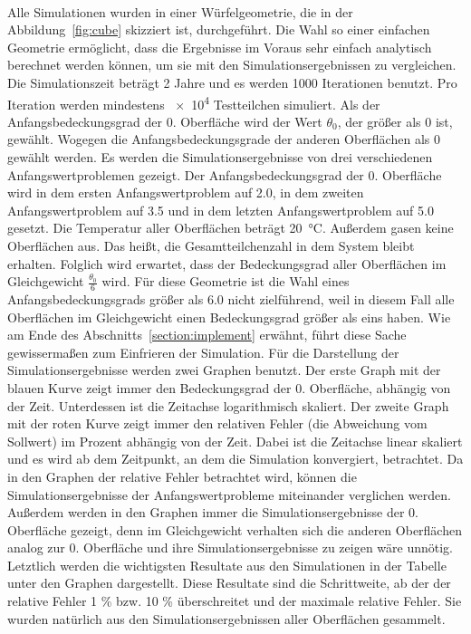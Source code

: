 \documentclass{listhesis}
\begin{document}
\paragraph{}
Alle Simulationen wurden in einer Würfelgeometrie, die in der Abbildung~\ref{fig:cube} skizziert ist, durchgeführt. Die Wahl so einer einfachen Geometrie ermöglicht, dass die Ergebnisse im Voraus sehr einfach analytisch berechnet werden können, um sie mit den Simulationsergebnissen zu vergleichen. Die Simulationszeit beträgt 2 Jahre und es werden 1000 Iterationen benutzt. Pro Iteration werden mindestens \SI{e4}{} Testteilchen simuliert. Als der Anfangsbedeckungsgrad der 0. Oberfläche wird der Wert $\theta_0$, der größer als 0 ist, gewählt. Wogegen die Anfangsbedeckungsgrade der anderen Oberflächen als 0 gewählt werden. Es werden die Simulationsergebnisse von drei verschiedenen Anfangswertproblemen gezeigt. Der Anfangsbedeckungsgrad der 0. Oberfläche wird in dem ersten Anfangswertproblem auf 2.0, in dem zweiten Anfangswertproblem auf 3.5 und in dem letzten Anfangswertproblem auf 5.0 gesetzt. Die Temperatur aller Oberflächen beträgt \SI{20}{\celsius}. Außerdem gasen keine Oberflächen aus. Das heißt, die Gesamtteilchenzahl in dem System bleibt erhalten. Folglich wird erwartet, dass der Bedeckungsgrad aller Oberflächen im Gleichgewicht $\frac{\theta_0}{6}$ wird. Für diese Geometrie ist die Wahl eines Anfangsbedeckungsgrads größer als 6.0 nicht zielführend, weil in diesem Fall alle Oberflächen im Gleichgewicht einen Bedeckungsgrad größer als eins haben. Wie am Ende des Abschnitts~\ref{section:implement} erwähnt, führt diese Sache gewissermaßen zum Einfrieren der Simulation. Für die Darstellung der Simulationsergebnisse werden zwei Graphen benutzt. Der erste Graph mit der blauen Kurve zeigt immer den Bedeckungsgrad der 0. Oberfläche, abhängig von der Zeit. Unterdessen ist die Zeitachse logarithmisch skaliert. Der zweite Graph mit der roten Kurve zeigt immer den relativen Fehler (die Abweichung vom Sollwert) im Prozent abhängig von der Zeit. Dabei ist die Zeitachse linear skaliert und es wird ab dem Zeitpunkt, an dem die Simulation konvergiert, betrachtet. Da in den Graphen der relative Fehler betrachtet wird, können die Simulationsergebnisse der Anfangswertprobleme miteinander verglichen werden. Außerdem werden in den Graphen immer die Simulationsergebnisse der 0. Oberfläche gezeigt, denn im Gleichgewicht verhalten sich die anderen Oberflächen analog zur 0. Oberfläche und ihre Simulationsergebnisse zu zeigen wäre unnötig. Letztlich werden die wichtigsten Resultate aus den Simulationen in der Tabelle unter den Graphen dargestellt. Diese Resultate sind die Schrittweite, ab der der relative Fehler 1 \% bzw. 10 \% überschreitet und der maximale relative Fehler. Sie wurden natürlich aus den Simulationsergebnissen aller Oberflächen gesammelt.
\end{document}
